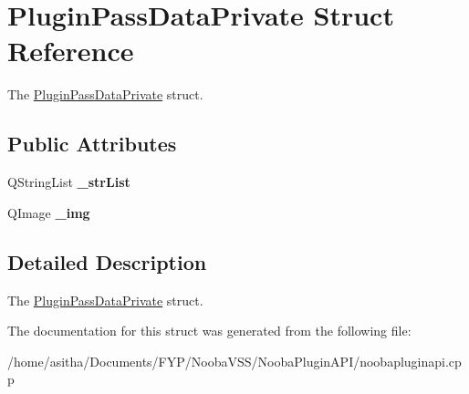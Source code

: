 \hypertarget{struct_plugin_pass_data_private}{\section{Plugin\-Pass\-Data\-Private Struct Reference}
\label{struct_plugin_pass_data_private}
}


The \hyperlink{struct_plugin_pass_data_private}{Plugin\-Pass\-Data\-Private} struct.  


\subsection*{Public Attributes}
\begin{DoxyCompactItemize}
\item 
\hypertarget{struct_plugin_pass_data_private_a9dd4ebe057161144341ebd490a95ca96}{Q\-String\-List {\bfseries \-\_\-str\-List}}\label{struct_plugin_pass_data_private_a9dd4ebe057161144341ebd490a95ca96}

\item 
\hypertarget{struct_plugin_pass_data_private_a92c4dc9f66daef3b1a2550ecf5e2ecd1}{Q\-Image {\bfseries \-\_\-img}}\label{struct_plugin_pass_data_private_a92c4dc9f66daef3b1a2550ecf5e2ecd1}

\end{DoxyCompactItemize}


\subsection{Detailed Description}
The \hyperlink{struct_plugin_pass_data_private}{Plugin\-Pass\-Data\-Private} struct. 

The documentation for this struct was generated from the following file\-:\begin{DoxyCompactItemize}
\item 
/home/asitha/\-Documents/\-F\-Y\-P/\-Nooba\-V\-S\-S/\-Nooba\-Plugin\-A\-P\-I/noobapluginapi.\-cpp\end{DoxyCompactItemize}

